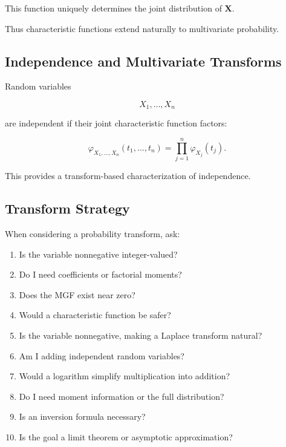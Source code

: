 This function uniquely determines the joint distribution of
\(\mathbf{X}\).

Thus characteristic functions extend naturally to multivariate
probability.

\subsection{Independence and Multivariate Transforms}
\label{subsec:independence-multivariate-transforms}

Random variables

\[
X_1,\ldots,X_n
\]

are independent if their joint characteristic function factors:

\[
\boxed{
\varphi_{X_1,\ldots,X_n}
(t_1,\ldots,t_n)
=
\prod_{j=1}^{n}
\varphi_{X_j}(t_j).
}
\]

This provides a transform-based characterization of independence.

\subsection{Transform Strategy}
\label{subsec:probability-transform-strategy}

When considering a probability transform, ask:

\begin{enumerate}
    \item Is the variable nonnegative integer-valued?
    \item Do I need coefficients or factorial moments?
    \item Does the MGF exist near zero?
    \item Would a characteristic function be safer?
    \item Is the variable nonnegative, making a Laplace transform natural?
    \item Am I adding independent random variables?
    \item Would a logarithm simplify multiplication into addition?
    \item Do I need moment information or the full distribution?
    \item Is an inversion formula necessary?
    \item Is the goal a limit theorem or asymptotic approximation?
\end{enumerate}

